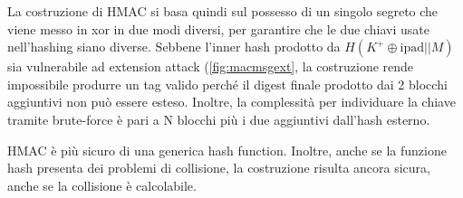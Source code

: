 La costruzione di HMAC si basa quindi sul possesso di un singolo segreto che viene messo in xor in due modi diversi, per garantire che le due chiavi usate nell'hashing siano diverse. Sebbene l'inner hash prodotto da $H(K^+\oplus{\text{ipad}}||M)$ sia vulnerabile ad extension attack (\cref{fig:macmsgext}, la costruzione rende impossibile produrre un tag valido perché il digest finale prodotto dai 2 blocchi aggiuntivi non può essere esteso. Inoltre, la complessità per individuare la chiave tramite brute-force è pari a N blocchi più i due aggiuntivi dall'hash esterno. 
\begin{note}
    HMAC è più sicuro di una generica hash function. Inoltre, anche se la funzione hash presenta dei problemi di collisione, la costruzione risulta ancora sicura, anche se la collisione è calcolabile.
\end{note}
